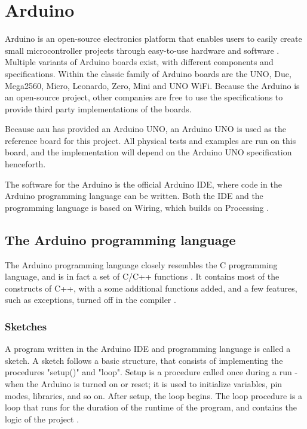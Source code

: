 \section{Arduino}\label{sec:arduino}
Arduino is an open-source electronics platform that enables users to easily create small microcontroller projects through easy-to-use hardware and software \cite{WhatArduino}. Multiple variants of Arduino boards exist, with different components and specifications. Within the classic family of Arduino boards are the UNO, Due, Mega2560, Micro, Leonardo, Zero, Mini and UNO WiFi. Because the Arduino is an open-source project, other companies are free to use the specifications to provide third party implementations of the boards.

Because \gls{aau} has provided an Arduino UNO, an Arduino UNO is used as the reference board for this project. All physical tests and examples are run on this board, and the implementation will depend on the Arduino UNO specification henceforth.

The software for the Arduino is the official Arduino IDE, where code in the Arduino programming language can be written. Both the IDE and the programming language is based on Wiring, which builds on Processing \cite{WhatArduino,WiringOrg}.

\subsection{The Arduino programming language}\label{subsec:arduinoprogramminglanguage}
The Arduino programming language closely resembles the C programming language, and is in fact a set of C/C++ functions \cite{ArduinoSupportC}. It contains most of the constructs of C++, with a some additional functions added, and a few features, such as exceptions, turned off in the compiler \cite{Nongnuorg}.

\subsubsection{Sketches}
A program written in the Arduino IDE and programming language is called a sketch. A sketch follows a basic structure, that consists of implementing the procedures "setup()" and "loop". Setup is a procedure called once during a run - when the Arduino is turned on or reset; it is used to initialize variables, pin modes, libraries, and so on. After setup, the loop begins. The loop procedure is a loop that runs for the duration of the runtime of the program, and contains the logic of the project \cite{ArduinoLanguage}.

